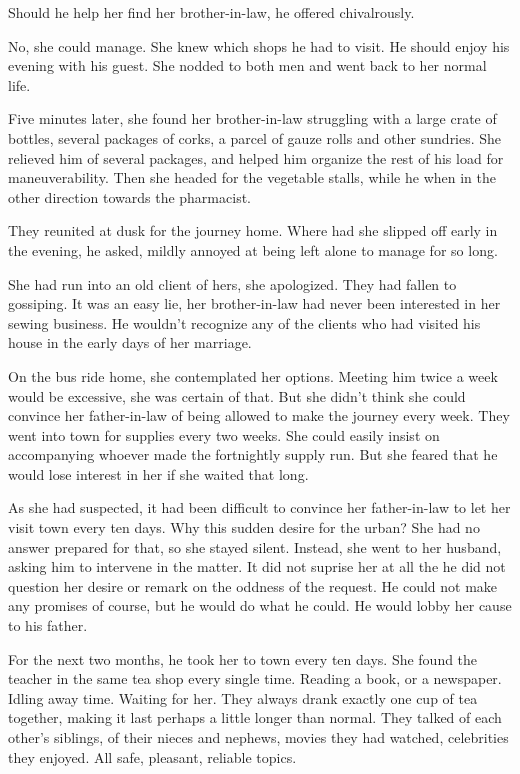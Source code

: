 \documentclass{article}
\newcommand{\egnote}{\todo[color=violet!30]}
\begin{document}
Should he help her find her brother-in-law, he offered chivalrously.

No, she could manage. She knew which shops he had to visit. He should enjoy his evening with his guest. She nodded to both men and went back to her normal life.

Five minutes later, she found her brother-in-law struggling with a large crate of bottles, several packages of corks, a parcel of gauze rolls and other sundries. She relieved him of several packages, and helped him organize the rest of his load for maneuverability. Then she headed for the vegetable stalls, while he when in the other direction towards the pharmacist. 

They reunited at dusk for the journey home. Where had she slipped off early in the evening, he asked, mildly annoyed at being left alone to manage for so long. 

She had run into an old client of hers, she apologized. They had fallen to gossiping. It was an easy lie, her brother-in-law had never been interested in her sewing business. He wouldn't recognize any of the clients who had visited his house in the early days of her marriage. 

On the bus ride home, she contemplated her options. Meeting him twice a week would be excessive, she was certain of that. But\egnote{and} she didn't think she could convince her father-in-law of being allowed to make the journey every week. They went into town for supplies every two weeks. She could easily insist on accompanying whoever made the fortnightly supply run. But she feared that he would lose interest in her if she waited that long. 

As she had suspected, it had been\egnote{was} difficult to convince her father-in-law to let her visit town every ten days. Why this sudden desire for the urban? She had no answer prepared for that, so she stayed silent. Instead, she went to her husband, asking him to intervene in the matter. It did not suprise her at all the he did not question her desire or remark on the oddness of the request. He could not make any promises of course, but he would do what he could. He would lobby her cause to his father. 

For the next two months, he\egnote{which he?} took her to town every ten days. She found the teacher in the same tea shop every single time. Reading a book, or a newspaper. Idling away time. Waiting for her. They always drank exactly one cup of tea together, making it last perhaps a little longer than normal. They talked of each other's siblings, of their nieces and nephews, movies they had watched, celebrities they enjoyed. All safe, pleasant, reliable topics. 
\end{document}
